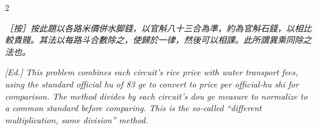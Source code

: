 \documentclass[11pt,a4paper]{article}
\newcommand{\EdNoteText}[1]{\par\noindent\textit{\color{ednotecolor}［按］#1}\par}
\newcommand{\EdNoteEn}[1]{\par\noindent\textit{\color{ednotecolor}[Ed.] #1}\par}
\begin{document}
\begin{paracol}{2}
\EdNoteText{按此題以各路米價併水脚錢，以官斛八十三合為準，約為官斛石錢，以相比較貴賤。其法以每路斗合數除之，使歸於一律，然後可以相課。此所謂異乘同除之法也。}
\switchcolumn
\EdNoteEn{This problem combines each circuit's rice price with water transport fees, using the standard official hu of 83 ge to convert to price per official-hu shi for comparison. The method divides by each circuit's dou ge measure to normalize to a common standard before comparing. This is the so-called ``different multiplication, same division'' method.}

\end{paracol}

\newpage
\end{document}
